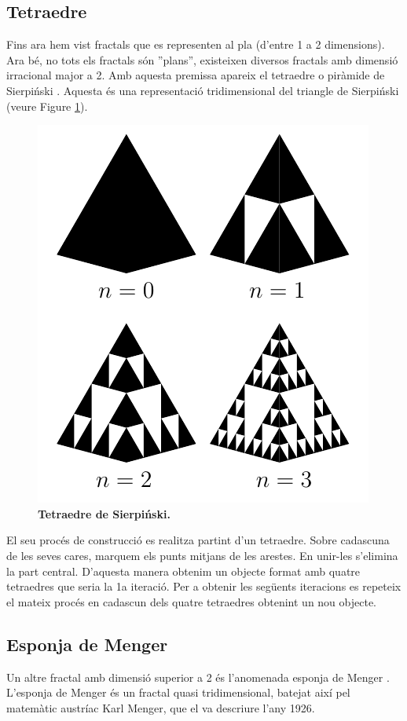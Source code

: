 \documentclass[12pt,a4paper]{report}
\begin{document}
\subsection{Tetraedre}
Fins ara hem vist fractals que es representen al pla (d'entre 1 a 2 dimensions). Ara bé, no tots els fractals  són ''plans'', existeixen diversos fractals amb dimensió irracional major a 2. Amb aquesta premissa apareix el tetraedre o piràmide de Sierpiński \cite[p.~129]{KitchenScience}. Aquesta és una representació tridimensional del triangle de Sierpiński (veure Figure \ref{img03_13}).
\begin{figure}[!ht]
\centering
\includegraphics[scale=1]{img/img03_13_sierpinskiTetra.pdf} 
\caption{\textbf{Tetraedre de Sierpiński.}}
\label{img03_13}
\end{figure}
El seu procés de construcció es realitza partint d'un tetraedre. Sobre cadascuna de les seves cares, marquem els punts mitjans de les arestes. En unir-les s'elimina la part central. D'aquesta manera obtenim un objecte format amb quatre tetraedres que seria la 1a iteració. Per a obtenir les següents iteracions es repeteix el mateix procés en cadascun dels quatre tetraedres obtenint un nou objecte.
\subsection{Esponja de Menger}
Un altre fractal amb dimensió superior a 2 és l'anomenada esponja de Menger \cite[p.~106]{ChaosFractal}. L'esponja de Menger és un fractal quasi tridimensional, batejat així pel matemàtic austríac Karl Menger, que el va descriure l'any 1926.
\end{document}
